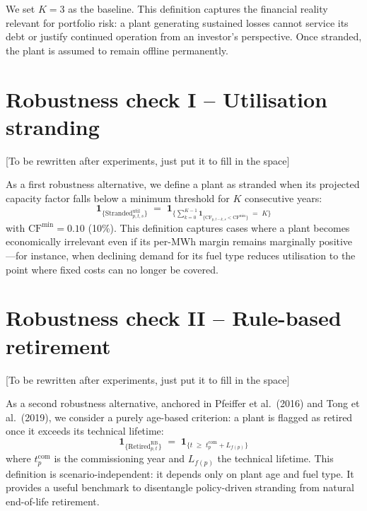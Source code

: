 \documentclass[a4paper, 12pt]{report}
\numberwithin{equation}{chapter}
\numberwithin{figure}{chapter}
\numberwithin{table}{chapter}
\newcommand{\ind}[1]{\mathbf{1}_{\{#1\}}}
\begin{document}
We set $K=3$ as the baseline. This definition captures the financial reality relevant for portfolio risk: a plant generating sustained losses cannot service its debt or justify continued operation from an investor's perspective. Once stranded, the plant is assumed to remain offline permanently.

\section{Robustness check I -- Utilisation stranding}
\label{sec:util_strand}

[To be rewritten after experiments, just put it to fill in the space]

As a first robustness alternative, we define a plant as stranded when its projected capacity factor falls below a minimum threshold for $K$ consecutive years:
\begin{equation}
\ind{\text{Stranded}^{\text{util}}_{p,t,s}} \;=\; \ind{\sum_{k=0}^{K-1} \ind{\text{CF}_{p,t-k,s} < \text{CF}^{\min}} \;=\; K}
\label{eq:util_strand}
\end{equation}
with $\text{CF}^{\min} = 0.10$ (10\%). This definition captures cases where a plant becomes economically irrelevant even if its per-MWh margin remains marginally positive---for instance, when declining demand for its fuel type reduces utilisation to the point where fixed costs can no longer be covered.

\section{Robustness check II -- Rule-based retirement}
\label{sec:rb_strand}

[To be rewritten after experiments, just put it to fill in the space]

As a second robustness alternative, anchored in Pfeiffer et al.\ (2016) and Tong et al.\ (2019), we consider a purely age-based criterion: a plant is flagged as retired once it exceeds its technical lifetime:
\begin{equation}
\ind{\text{Retired}^{\text{RB}}_{p,t}} \;=\; \ind{t \;\geq\; t^{\text{com}}_p + L_{f(p)}}
\label{eq:rb_strand}
\end{equation}
where $t^{\text{com}}_p$ is the commissioning year and $L_{f(p)}$ the technical lifetime. This definition is scenario-independent: it depends only on plant age and fuel type. It provides a useful benchmark to disentangle policy-driven stranding from natural end-of-life retirement.
\end{document}
